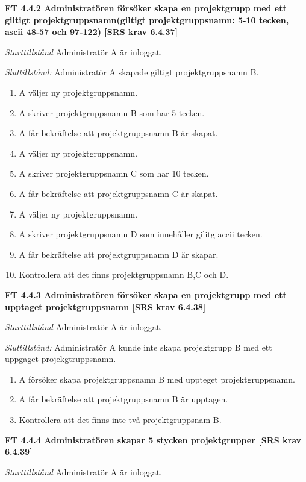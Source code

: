 \documentclass[a4paper]{article}
\begin{document}
\textbf{FT 4.4.2 Administratören försöker skapa en projektgrupp med ett giltigt projektgruppsnamn(giltigt projektgruppsnamn: 5-10 tecken, ascii 48-57 och 97-122) [SRS krav 6.4.37]}

\emph{Starttillstånd} Administratör A  är inloggat.

\emph{Sluttillstånd:} Administratör A  skapade  giltigt projektgruppsnamn B.

\begin{enumerate}
\item A väljer ny projektgruppsnamn.
\item A skriver projektgruppsnamn B som har 5 tecken.
\item A får bekräftelse att projektgruppsnamn B är skapat.
\item A väljer ny projektgruppsnamn.
\item A skriver projektgruppsnamn C som har 10 tecken.
\item A får bekräftelse att projektgruppsnamn C är skapat.
\item A väljer ny projektgruppsnamn.
\item A skriver projektgruppsnamn D som innehåller gilitg accii tecken.
\item A får bekräftelse att projektgruppsnamn D är skapar.
\item Kontrollera att det finns projektgruppsnamn B,C och D.
\end{enumerate}

\textbf{FT 4.4.3 Administratören försöker skapa en projektgrupp med ett upptaget projektgruppsnamn [SRS krav 6.4.38]}

\emph{Starttillstånd} Administratör A är inloggat.

\emph{Sluttillstånd:} Administratör A kunde inte skapa  projektgrupp B med ett uppgaget projekgtruppsnamn.

\begin{enumerate}
\item A försöker skapa  projektgruppsnamn B med uppteget projektgruppsnamn.
\item A får bekräftelse att projektgruppsnamn B är upptagen.
\item Kontrollera att det finns inte två projektgruppsnam B.
\end{enumerate}

\textbf{FT 4.4.4 Administratören skapar 5 stycken projektgrupper [SRS krav 6.4.39]}

\emph{Starttillstånd} Administratör A är inloggat. 
\end{document}
